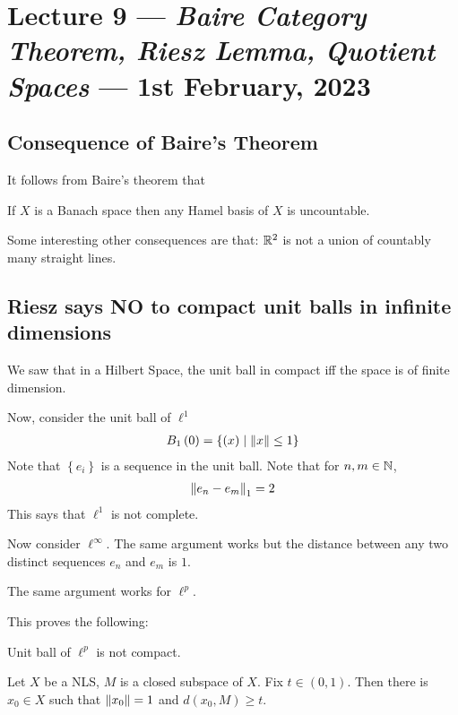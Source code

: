 \section{Lecture 9 --- \textit{Baire Category Theorem, Riesz Lemma, Quotient Spaces} --- 1st February, 2023}
\horz

\subsection{Consequence of Baire's Theorem}

It follows from Baire's theorem that
\begin{proposition}
    If $X$ is a Banach space then any Hamel basis of $X$ is uncountable.
    \label{prop:B-space-implies-uncountable-Hamel-basis}
\end{proposition}

Some interesting other consequences are that: $\mathbb R^{2}$ is not a union of countably many straight lines.

\subsection{Riesz says NO to compact unit balls in infinite dimensions}

We saw that in a Hilbert Space, the unit ball in compact iff the space is of finite dimension.

Now, consider the unit ball of $\ell ^{1}$
\begin{align*}
    B_{1} \left( 0 \right) = \left\{ \left( x \right) \mid \left\lVert x \right\rVert \le 1 \right\}
\end{align*}
Note that $\left\{ e_{i} \right\}$ is a sequence in the unit ball. Note that for $n,m \in \mathbb N$,
\begin{align*}
    \left\lVert e_{n} - e_{m} \right\rVert_{1} =2
\end{align*}
This says that $\ell ^{1}$  is not complete.

Now consider $\ell ^{\infty}$. The same argument works but the distance between any two distinct sequences $e_{n}$ and $e_{m}$ is $1$.

The same argument works for $\ell ^{p}$.

This proves the following:
\begin{proposition}
    Unit ball of $\ell ^{p}$ is not compact.
\end{proposition}

\begin{proposition}
    Let $X$ be a NLS, $M$ is a closed subspace of $X$. Fix $t \in (0,1)$. Then there is $x_{0} \in X$ such that $\left\lVert x_{0} \right\rVert=1$ and $d\left( x_{0}, M \right) \ge t$.
\end{proposition}


